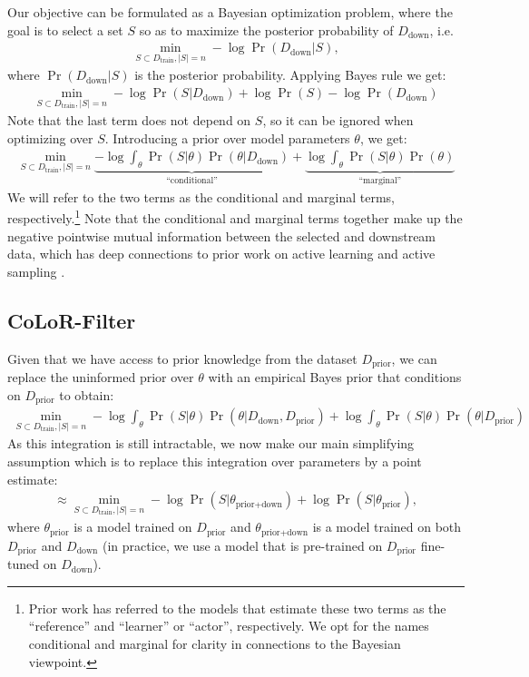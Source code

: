 \documentclass{article}
\newcommand{\Dprior}{D_{\text{prior}}}
\newcommand{\Ddown}{D_{\text{down}}}
\newcommand{\Dtrain}{D_{\text{train}}}
\newcommand{\thetaprior}{\theta_{\text{prior}}}
\newcommand{\thetapriordown}{\theta_{\text{prior}+ \text{down}}}
\begin{document}
Our objective can be formulated as a Bayesian optimization problem, where the goal is to select a set $S$ so as to maximize the posterior probability of $\Ddown$, i.e.
\begin{align}
    \min_{S \subset \Dtrain, |S| = n} -\log \Pr (\Ddown | S),
\end{align}
where $\Pr (\Ddown | S)$ is the posterior probability.
Applying Bayes rule we get:
\begin{align}
    \min_{S \subset \Dtrain, |S| = n} -\log \Pr(S| \Ddown) + \log \Pr(S) - \log \Pr(\Ddown)
\end{align}
Note that the last term does not depend on $ S$, so it can be ignored when optimizing over $ S$. Introducing a prior over model parameters $ \theta$, we get:
\begin{align}\label{eq:bayes}
     \min_{S \subset \Dtrain, |S| = n} \underbrace{-\log \int_\theta\Pr(S| \theta)\Pr(\theta | \Ddown)}_{\text{``conditional''}} + \underbrace{\log \int_\theta \Pr(S | \theta)\Pr(\theta)}_{\text{``marginal''}}
\end{align}
We will refer to the two terms as the conditional and marginal terms, respectively.\footnote{Prior work \citep{mindermann2022prioritized, evans2023bad} has referred to the models that estimate these two terms as the ``reference'' and ``learner'' or ``actor'', respectively. We opt for the names conditional and marginal for clarity in connections to the Bayesian viewpoint.} Note that the conditional and marginal terms together make up the negative pointwise mutual information between the selected and downstream data, which has deep connections to prior work on active learning and active sampling \citep{lindley1956measure, moore2010intelligent, houlsby2011bayesian, bickfordsmith2023prediction, kirsch2023a, rainforth2024modern}.

\subsection{CoLoR-Filter}\label{sec:color-filter}
Given that we have access to prior knowledge from the dataset $ \Dprior$, we can replace the uninformed prior over $ \theta $ with an empirical Bayes prior that conditions on $\Dprior$ to obtain:
\begin{align}
     \min_{S \subset \Dtrain, |S| = n} -\log \int_\theta\Pr(S| \theta)\Pr(\theta | \Ddown, \Dprior) + \log \int_\theta \Pr(S | \theta)\Pr(\theta| \Dprior)
\end{align}
As this integration is still intractable, we now make our main simplifying assumption which is to replace this integration over parameters by a point estimate: 
\begin{align}\label{eq:prior}
     \approx \min_{S \subset \Dtrain, |S| = n}  -\log \Pr(S | \thetapriordown) + \log \Pr(S | \thetaprior),
\end{align}
where $ \thetaprior$ is a model trained on $ \Dprior$ and $ \thetapriordown$ is a model trained on both $ \Dprior$ and  $\Ddown$ (in practice, we use a model that is pre-trained on $ \Dprior$ fine-tuned on $ \Ddown$). 
\end{document}
